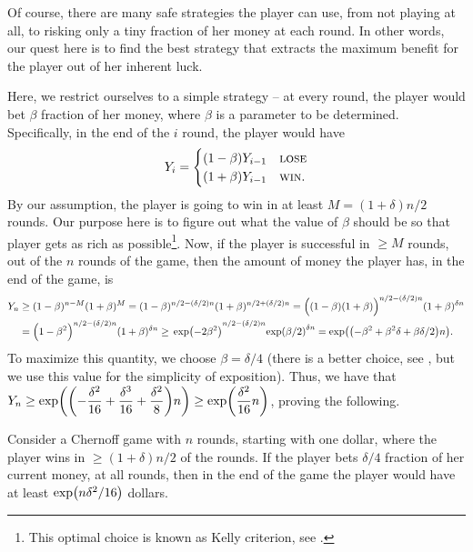 Of course, there are many safe strategies the player can use, from not
playing at all, to risking only a tiny fraction of her money at each
round.  In other words, our quest here is to find the best strategy
that extracts the maximum benefit for the player out of her inherent
luck.

Here, we restrict ourselves to a simple strategy -- at every round,
the player would bet $\beta$ fraction of her money, where $\beta$ is a
parameter to be determined.  Specifically, in the end of the $i$\th
round, the player would have
\begin{align*}
    Y_{i} = \begin{cases}
        (1-\beta) Y_{i-1}  & \text{\textsc{lose}}\\
        (1+\beta) Y_{i-1} & \text{\textsc{win}}.
    \end{cases}
\end{align*}
By our assumption, the player is going to win in at least
$M=(1+\delta)n/2$ rounds.  Our purpose here is to figure out what the
value of $\beta$ should be so that player gets as rich as
possible\footnote{This optimal choice is known as Kelly criterion,
   see .}.  Now, if the player is successful in $\geq M$
rounds, out of the $n$ rounds of the game, then the amount of money
the player has, in the end of the game, is
\begin{align*}
    Y_n%
    &\geq%
    (1-\beta)^{n-M} (1+\beta)^M%
    =%
    (1-\beta)^{n/2 -(\delta/2)n} (1+\beta)^{n/2 +(\delta/2)n}%
    =%
    \pth[]{\Big. (1-\beta)(1+\beta)}^{n/2 -(\delta/2)n}
    (1+\beta)^{\delta n}%
    \\&%
    =%
    \pth[]{\Big. 1-\beta^2 }^{n/2 -(\delta/2)n} (1+\beta)^{\delta n}%
    \geq%
    {\Big. \exp\pth{ -2\beta^2} }^{n/2 -(\delta/2)n}
    {\exp\pth{\beta/2}}^{\delta n}%
    =%
    \exp\pth{ \pth[]{ -\beta^2 +\beta^2 \delta + \beta \delta /2 } n
    }.
\end{align*}
To maximize this quantity, we choose $\beta = \delta/4$ (there is a
better choice, see , but we use this value for the
simplicity of exposition).  Thus, we have that $\ds Y_n \geq \exp\pth{
   \pth[]{ -\frac{\delta^2}{16} + \frac{\delta^3}{16} +
      \frac{\delta^2}{8} } n } \geq \exp\pth{ \frac{\delta^2}{16} n
}$, proving the following.

\begin{lemma}%
    Consider a Chernoff game with $n$ rounds, starting with one
    dollar, where the player wins in $\geq (1+\delta)n/2$ of the
    rounds. If the player bets $\delta/4$ fraction of her current
    money, at all rounds, then in the end of the game the player would
    have at least $\exp\pth{n \delta^2 / 16}$ dollars.
\end{lemma}


